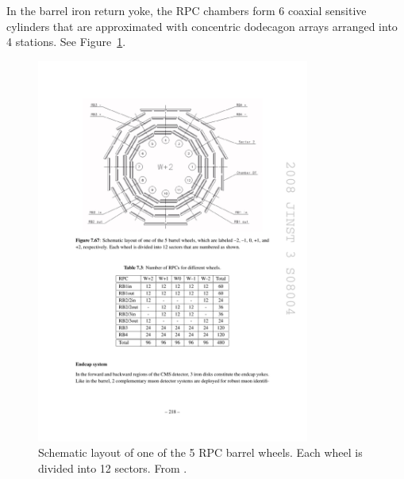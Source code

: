 In the barrel iron return yoke, the RPC chambers form 6 coaxial sensitive cylinders
that are approximated with concentric dodecagon arrays arranged into 4 stations. See Figure~\ref{fig:cms_rpc_barrel}.

\begin{figure}[hbtp]
\centering
\includegraphics[width=0.8\textwidth]{figures/cms_rpc_barrel.pdf}
\caption{
Schematic layout of one of the 5 RPC barrel wheels. Each wheel is divided into 12 sectors.
From \cite{Chatrchyan:2008aa}.
}
\label{fig:cms_rpc_barrel}
\end{figure}

\clearpage


